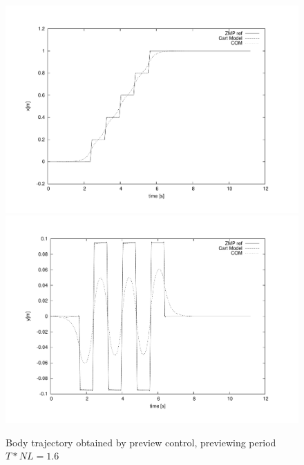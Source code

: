 \begin{figure}[htb]
\begin{center}
\includegraphics[width=\linewidth]{./figures/PatternGenerator/FigurePC1_X}
\includegraphics[width=\linewidth]{./figures/PatternGenerator/FigurePC1_Y}
\caption{Body trajectory obtained by preview control, previewing period $T * NL = 1.6$ }
\label{pic:BodyTrajectory}
\end{center}
\end{figure}
\clearpage
